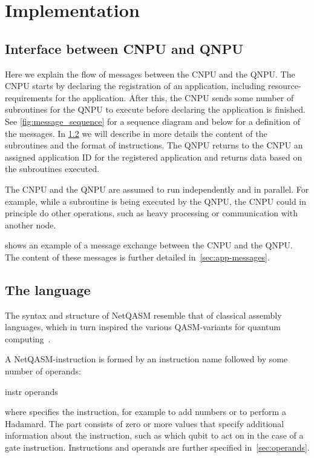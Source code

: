 \section{Implementation}
\label{sec:implementation}


\subsection{Interface between \ac{CNPU} and \ac{QNPU}}
Here we explain the flow of messages between the \ac{CNPU} and the \ac{QNPU}.
The \ac{CNPU} starts by declaring the registration of an application, including resource-requirements for the application.
After this, the \ac{CNPU} sends some number of subroutines for the \ac{QNPU} to execute before declaring the application is finished.
See \cref{fig:message_sequence} for a sequence diagram and below for a definition of the messages.
In \cref{sec:language} we will describe in more details the content of the subroutines and the format of instructions.
The \ac{QNPU} returns to the \ac{CNPU} an assigned application ID for the registered application and returns data based on the subroutines executed.

The \ac{CNPU} and the \ac{QNPU} are assumed to run independently and in parallel.
For example, while a subroutine is being executed by the \ac{QNPU}, the \ac{CNPU} could in principle do other operations, such as heavy processing or communication with another node.


 shows an example of a message exchange between the \ac{CNPU} and the \ac{QNPU}.
The content of these messages is further detailed in~\cref{sec:app-messages}.



\subsection{The language}
\label{sec:language}
The syntax and structure of \ac{NetQASM} resemble that of classical assembly languages, which in turn inspired the various QASM-variants for quantum computing~\cite{cross2017openqasm, khammassi2018cqasm, fu2019eqasm, liu2017fqasm}.

A \ac{NetQASM}-instruction is formed by an instruction name followed by some number of operands:
\begin{nqcode}
      instr operands
\end{nqcode}
where  specifies the instruction, for example  to add numbers or  to perform a Hadamard.
The  part consists of zero or more values that specify additional information about the instruction, such as which qubit to act on in the case of a gate instruction.
Instructions and operands are further specified in~\cref{sec:operands}.

